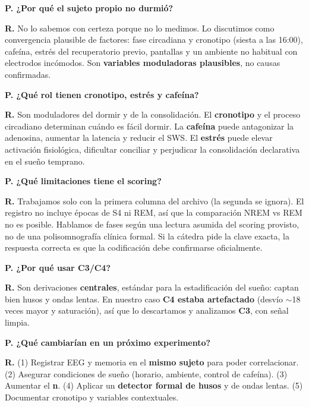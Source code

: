 \documentclass[11pt,a4paper]{article}
\newcommand{\pregunta}[1]{\vspace{4pt}\noindent\textbf{\color{navy}P. #1}\par\nopagebreak}
\newcommand{\respuesta}[1]{\noindent\textbf{R.} #1\par}
\begin{document}
\pregunta{¿Por qué el sujeto propio no durmió?}
\respuesta{No lo sabemos con certeza porque no lo medimos. Lo discutimos como convergencia
plausible de factores: fase circadiana y cronotipo (siesta a las 16:00), cafeína, estrés del
recuperatorio previo, pantallas y un ambiente no habitual con electrodos incómodos. Son
\textbf{variables moduladoras plausibles}, no causas confirmadas.}

\pregunta{¿Qué rol tienen cronotipo, estrés y cafeína?}
\respuesta{Son moduladores del dormir y de la consolidación. El \textbf{cronotipo} y el proceso
circadiano determinan cuándo es fácil dormir. La \textbf{cafeína} puede antagonizar la adenosina,
aumentar la latencia y reducir el SWS. El \textbf{estrés} puede elevar activación fisiológica,
dificultar conciliar y perjudicar la consolidación declarativa en el sueño temprano.}

\pregunta{¿Qué limitaciones tiene el scoring?}
\respuesta{Trabajamos solo con la primera columna del archivo (la segunda se ignora). El
registro no incluye épocas de S4 ni REM, así que la comparación NREM vs REM no es posible.
Hablamos de fases según una lectura asumida del scoring provisto, no de una polisomnografía
clínica formal. Si la cátedra pide la clave exacta, la respuesta correcta es que la codificación
debe confirmarse oficialmente.}

\pregunta{¿Por qué usar C3/C4?}
\respuesta{Son derivaciones \textbf{centrales}, estándar para la estadificación del sueño: captan
bien husos y ondas lentas. En nuestro caso \textbf{C4 estaba artefactado} (desvío $\sim$18 veces
mayor y saturación), así que lo descartamos y analizamos \textbf{C3}, con señal limpia.}

\pregunta{¿Qué cambiarían en un próximo experimento?}
\respuesta{(1) Registrar EEG y memoria en el \textbf{mismo sujeto} para poder correlacionar.
(2) Asegurar condiciones de sueño (horario, ambiente, control de cafeína). (3) Aumentar el
\textbf{n}. (4) Aplicar un \textbf{detector formal de husos} y de ondas lentas. (5) Documentar
cronotipo y variables contextuales.}

\end{document}
